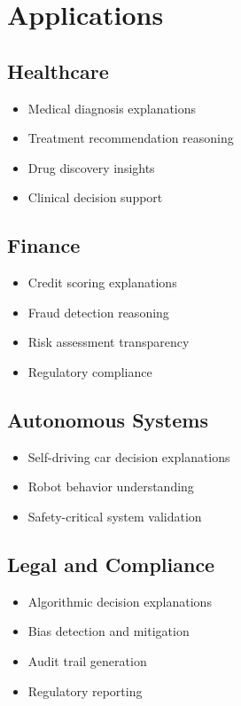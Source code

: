 \documentclass[11pt]{article}
\theoremstyle{definition}
\begin{document}
\section{Applications}

\subsection{Healthcare}
\begin{itemize}
    \item Medical diagnosis explanations
    \item Treatment recommendation reasoning
    \item Drug discovery insights
    \item Clinical decision support
\end{itemize}

\subsection{Finance}
\begin{itemize}
    \item Credit scoring explanations
    \item Fraud detection reasoning
    \item Risk assessment transparency
    \item Regulatory compliance
\end{itemize}

\subsection{Autonomous Systems}
\begin{itemize}
    \item Self-driving car decision explanations
    \item Robot behavior understanding
    \item Safety-critical system validation
\end{itemize}

\subsection{Legal and Compliance}
\begin{itemize}
    \item Algorithmic decision explanations
    \item Bias detection and mitigation
    \item Audit trail generation
    \item Regulatory reporting
\end{itemize}
\end{document}
